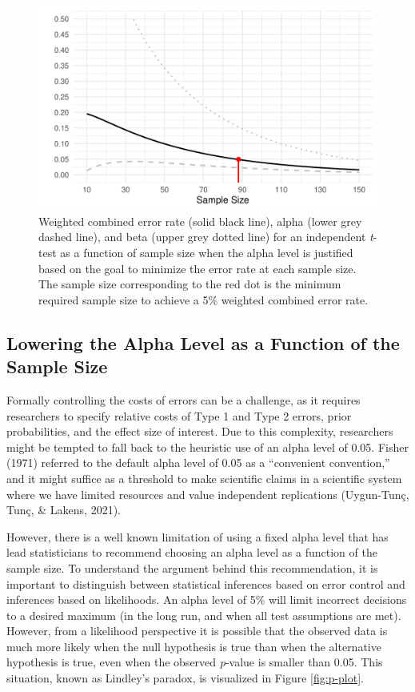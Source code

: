 \documentclass[
  english,
  ,jou, a4paper,floatsintext]{apa6}
\begin{document}
\begin{figure}
\centering
\includegraphics{Justify_in_Practice_files/figure-latex/error-plot-1.pdf}
\caption{\label{fig:error-plot}Weighted combined error rate (solid black line), alpha (lower grey dashed line), and beta (upper grey dotted line) for an independent \emph{t}-test as a function of sample size when the alpha level is justified based on the goal to minimize the error rate at each sample size. The sample size corresponding to the red dot is the minimum required sample size to achieve a 5\% weighted combined error rate.}
\end{figure}

\hypertarget{lowering-the-alpha-level-as-a-function-of-the-sample-size}{%
\subsection{Lowering the Alpha Level as a Function of the Sample Size}\label{lowering-the-alpha-level-as-a-function-of-the-sample-size}}

Formally controlling the costs of errors can be a challenge, as it requires researchers to specify relative costs of Type 1 and Type 2 errors, prior probabilities, and the effect size of interest. Due to this complexity, researchers might be tempted to fall back to the heuristic use of an alpha level of 0.05. Fisher (1971) referred to the default alpha level of 0.05 as a ``convenient convention,'' and it might suffice as a threshold to make scientific claims in a scientific system where we have limited resources and value independent replications (Uygun-Tunç, Tunç, \& Lakens, 2021).

However, there is a well known limitation of using a fixed alpha level that has lead statisticians to recommend choosing an alpha level as a function of the sample size. To understand the argument behind this recommendation, it is important to distinguish between statistical inferences based on error control and inferences based on likelihoods. An alpha level of 5\% will limit incorrect decisions to a desired maximum (in the long run, and when all test assumptions are met). However, from a likelihood perspective it is possible that the observed data is much more likely when the null hypothesis is true than when the alternative hypothesis is true, even when the observed \emph{p}-value is smaller than 0.05. This situation, known as Lindley's paradox, is visualized in Figure \ref{fig:p-plot}.
\end{document}
